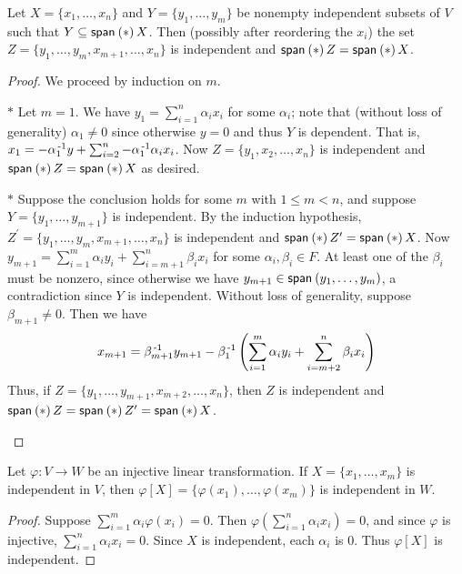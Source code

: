 \documentclass{memoir}
\begin{document}
\begin{prp}
Let $X = \{x_1,\ldots,x_n\}$ and $Y = \{y_1,\ldots,y_m\}$ be nonempty independent subsets of $V$ such that $Y \subseteq \operatorname{\mathsf{span}}_{}\left(*\right){X}$. Then (possibly after reordering the $x_i$) the set $Z = \{y_1,\ldots,y_m,x_{m+1},\ldots,x_n\}$ is independent and $\operatorname{\mathsf{span}}_{}\left(*\right){Z} = \operatorname{\mathsf{span}}_{}\left(*\right){X}$.
\end{prp}

\begin{proof}
We proceed by induction on $m$.
\begin{enumerate*}
\item[$\ast$] Let $m = 1$. We have $y_1 = \sum_{i=1}^n \alpha_i x_i$ for some $\alpha_i$; note that (without loss of generality) $\alpha_1 \neq 0$ since otherwise $y = 0$ and thus $Y$ is dependent. That is, $x_1 = -\alpha_1^{{\,\text{-}1}} y + \sum_{i=2}^n -\alpha_1^{{\,\text{-}1}} \alpha_i x_i$. Now  $Z = \{y_1,x_2,\ldots,x_n\}$ is independent and $\operatorname{\mathsf{span}}_{}\left(*\right){Z} = \operatorname{\mathsf{span}}_{}\left(*\right){X}$ as desired.
\item[$\ast$] Suppose the conclusion holds for some $m$ with $1 \leq m < n$, and suppose $Y = \{y_1,\ldots,y_{m+1}\}$ is independent. By the induction hypothesis, $Z^\prime = \{y_1,\ldots,y_m,x_{m+1},\ldots,x_n\}$ is independent and $\operatorname{\mathsf{span}}_{}\left(*\right){Z^\prime} = \operatorname{\mathsf{span}}_{}\left(*\right){X}$. Now $y_{m+1} = \sum_{i=1}^m \alpha_i y_i + \sum_{i=m+1}^n \beta_i x_i$ for some $\alpha_i,\beta_i \in F$. At least one of the $\beta_i$ must be nonzero, since otherwise we have $y_{m+1} \in \operatorname{\mathsf{span}}_{}\left(y_1,\ldots,y_m\right)$, a contradiction since $Y$ is independent. Without loss of generality, suppose $\beta_{m+1} \neq 0$. Then we have \[x_{m+1} = \beta_{m+1}^{{\,\text{-}1}} y_{m+1} - \beta_1^{{\,\text{-}1}} \left( \sum_{i=1}^m \alpha_i y_i + \sum_{i=m+2}^n \beta_i x_i \right) \] Thus, if $Z = \{y_1,\ldots,y_{m+1},x_{m+2},\ldots,x_n\}$, then $Z$ is independent and $\operatorname{\mathsf{span}}_{}\left(*\right){Z} = \operatorname{\mathsf{span}}_{}\left(*\right){Z^\prime} = \operatorname{\mathsf{span}}_{}\left(*\right){X}$. \qedhere
\end{enumerate*}
\end{proof}

\begin{prp}
Let $\varphi : V \rightarrow W$ be an injective linear transformation. If $X = \{x_1,\ldots,x_m\}$ is independent in $V$, then $\varphi[X] = \{\varphi(x_1), \ldots, \varphi(x_m)\}$ is independent in $W$.
\end{prp}

\begin{proof}
Suppose $\sum_{i=1}^m \alpha_i \varphi(x_i) = 0$. Then $\varphi\left( \sum_{i=1}^n \alpha_i x_i \right) = 0$, and since $\varphi$ is injective, $\sum_{i=1}^n \alpha_i x_i = 0$. Since $X$ is independent, each $\alpha_i$ is 0. Thus $\varphi[X]$ is independent.
\end{proof}
\end{document}
